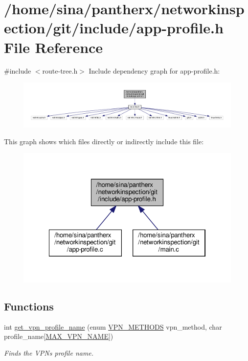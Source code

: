 \hypertarget{app-profile_8h}{}\section{/home/sina/pantherx/networkinspection/git/include/app-\/profile.h File Reference}
\label{app-profile_8h}
{\ttfamily \#include $<$route-\/tree.\+h$>$}\newline
Include dependency graph for app-\/profile.h\+:\nopagebreak
\begin{figure}[H]
\begin{center}
\leavevmode
\includegraphics[width=350pt]{app-profile_8h__incl}
\end{center}
\end{figure}
This graph shows which files directly or indirectly include this file\+:\nopagebreak
\begin{figure}[H]
\begin{center}
\leavevmode
\includegraphics[width=322pt]{app-profile_8h__dep__incl}
\end{center}
\end{figure}
\subsection*{Functions}
\begin{DoxyCompactItemize}
\item 
int \hyperlink{app-profile_8h_a2af00bda795682f62e77417d4969e2e5}{get\+\_\+vpn\+\_\+profile\+\_\+name} (enum \hyperlink{route-tree_8h_a5b876670828c4e38106ba1c6d91024b7}{V\+P\+N\+\_\+\+M\+E\+T\+H\+O\+DS} vpn\+\_\+method, char profile\+\_\+name\mbox{[}\hyperlink{route-tree_8h_a77ed9a5f9670b7a2d69c376d1199eddf}{M\+A\+X\+\_\+\+V\+P\+N\+\_\+\+N\+A\+ME}\mbox{]})
\begin{DoxyCompactList}\small\item\em Finds the V\+PN\textquotesingle{}s profile name. \end{DoxyCompactList}\end{DoxyCompactItemize}


